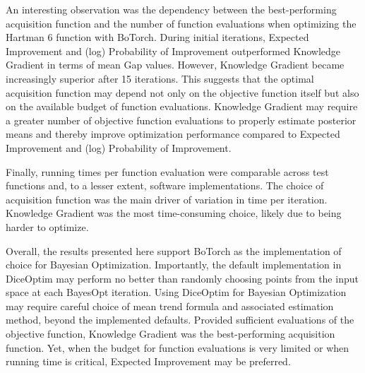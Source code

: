 An interesting observation was the dependency between the best-performing acquisition function and the number of function evaluations when optimizing the Hartman 6 function with BoTorch. During initial iterations, Expected Improvement and (log) Probability of Improvement outperformed Knowledge Gradient in terms of mean Gap values. However, Knowledge Gradient became increasingly superior after 15 iterations. This suggests that the optimal acquisition function may depend not only on the objective function itself but also on the available budget of function evaluations. Knowledge Gradient may require a greater number of objective function evaluations to properly estimate posterior means and thereby improve optimization performance compared to Expected Improvement and (log) Probability of Improvement.

Finally, running times per function evaluation were comparable across test functions and, to a lesser extent, software implementations. The choice of acquisition function was the main driver of variation in time per iteration. Knowledge Gradient was the most time-consuming choice, likely due to being harder to optimize.

Overall, the results presented here support BoTorch as the implementation of choice for Bayesian Optimization. Importantly, the default implementation in DiceOptim may perform no better than randomly choosing points from the input space at each BayesOpt iteration. Using DiceOptim for Bayesian Optimization may require careful choice of mean trend formula and associated estimation method, beyond the implemented defaults. Provided sufficient evaluations of the objective function, Knowledge Gradient was the best-performing acquisition function. Yet, when the budget for function evaluations is very limited or when running time is critical, Expected Improvement may be preferred.